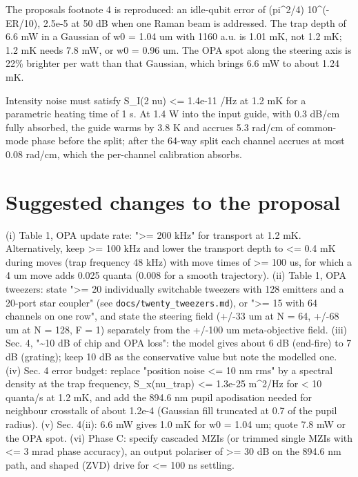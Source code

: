 The proposal\textquotesingle s footnote 4 is reproduced: an idle-qubit
error of (pi\^{}2/4) 10\^{}(-ER/10), 2.5e-5 at 50 dB when one Raman beam
is addressed. The trap depth of 6.6 mW in a Gaussian of w0 = 1.04 um
with 1160 a.u. is 1.01 mK, not 1.2 mK; 1.2 mK needs 7.8 mW, or w0 = 0.96
um. The OPA spot along the steering axis is 22\% brighter per watt than
that Gaussian, which brings 6.6 mW to about 1.24 mK.

Intensity noise must satisfy S\_I(2 nu) \textless= 1.4e-11 /Hz at 1.2 mK
for a parametric heating time of 1 s. At 1.4 W into the input guide,
with 0.3 dB/cm fully absorbed, the guide warms by 3.8 K and accrues 5.3
rad/cm of common-mode phase before the split; after the 64-way split
each channel accrues at most 0.08 rad/cm, which the per-channel
calibration absorbs.

\hypertarget{8-suggested-changes-to-the-proposal}{%
\section{Suggested changes to the
proposal}\label{findings-8-suggested-changes-to-the-proposal}}

(i) Table 1, OPA update rate: "\textgreater= 200 kHz" for transport at
1.2 mK. Alternatively, keep \textgreater= 100 kHz and lower the
transport depth to \textless= 0.4 mK during moves (trap frequency 48
kHz) with move times of \textgreater= 100 us, for which a 4 um move adds
0.025 quanta (0.008 for a smooth trajectory). (ii) Table 1, OPA
tweezers: state "\textgreater= 20 individually switchable tweezers with
128 emitters and a 20-port star coupler" (see
\texttt{docs/twenty\_tweezers.md}), or "\textgreater= 15 with 64
channels on one row", and state the steering field (+/-33 um at N = 64,
+/-68 um at N = 128, F = 1) separately from the +/-100 um meta-objective
field. (iii) Sec. 4, "\textasciitilde10 dB of chip and OPA loss": the
model gives about 6 dB (end-fire) to 7 dB (grating); keep 10 dB as the
conservative value but note the modelled one. (iv) Sec. 4 error budget:
replace "position noise \textless= 10 nm rms" by a spectral density at
the trap frequency, S\_x(nu\_trap) \textless= 1.3e-25 m\^{}2/Hz for
\textless{} 10 quanta/s at 1.2 mK, and add the 894.6 nm pupil
apodisation needed for neighbour crosstalk of about 1.2e-4 (Gaussian
fill truncated at 0.7 of the pupil radius). (v) Sec. 4(ii): 6.6 mW gives
1.0 mK for w0 = 1.04 um; quote 7.8 mW or the OPA spot. (vi) Phase C:
specify cascaded MZIs (or trimmed single MZIs with \textless= 3 mrad
phase accuracy), an output polariser of \textgreater= 30 dB on the 894.6
nm path, and shaped (ZVD) drive for \textless= 100 ns settling.

